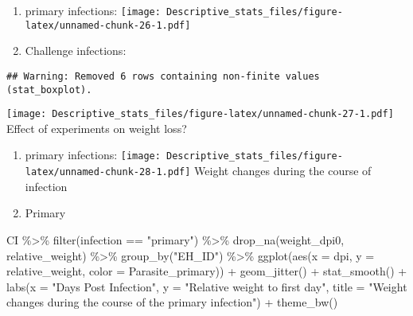 \documentclass[
]{article}
\newenvironment{Shaded}{\begin{snugshade}}{\end{snugshade}}
\newcommand{\AttributeTok}[1]{\textcolor[rgb]{0.77,0.63,0.00}{#1}}
\newcommand{\FunctionTok}[1]{\textcolor[rgb]{0.00,0.00,0.00}{#1}}
\newcommand{\NormalTok}[1]{#1}
\newcommand{\SpecialCharTok}[1]{\textcolor[rgb]{0.00,0.00,0.00}{#1}}
\newcommand{\StringTok}[1]{\textcolor[rgb]{0.31,0.60,0.02}{#1}}
\providecommand{\tightlist}{%
  \setlength{\itemsep}{0pt}\setlength{\parskip}{0pt}}
\begin{document}
\begin{enumerate}
\def\labelenumi{\arabic{enumi}.}
\item
  primary infections:
  \texttt{[image: Descriptive\_stats\_files/figure-latex/unnamed-chunk-26-1.pdf]}
\item
  Challenge infections:
\end{enumerate}

\begin{verbatim}
## Warning: Removed 6 rows containing non-finite values (stat_boxplot).
\end{verbatim}

\texttt{[image: Descriptive\_stats\_files/figure-latex/unnamed-chunk-27-1.pdf]}
Effect of experiments on weight loss?

\begin{enumerate}
\def\labelenumi{\arabic{enumi}.}
\tightlist
\item
  primary infections:
  \texttt{[image: Descriptive\_stats\_files/figure-latex/unnamed-chunk-28-1.pdf]}
  Weight changes during the course of infection
\item
  Primary
\end{enumerate}

\begin{Shaded}
\begin{Highlighting}[]
\NormalTok{CI }\SpecialCharTok{\%\textgreater{}\%} 
    \FunctionTok{filter}\NormalTok{(infection }\SpecialCharTok{==} \StringTok{"primary"}\NormalTok{) }\SpecialCharTok{\%\textgreater{}\%}
    \FunctionTok{drop\_na}\NormalTok{(weight\_dpi0, relative\_weight) }\SpecialCharTok{\%\textgreater{}\%}
    \FunctionTok{group\_by}\NormalTok{(}\StringTok{"EH\_ID"}\NormalTok{) }\SpecialCharTok{\%\textgreater{}\%}
    \FunctionTok{ggplot}\NormalTok{(}\FunctionTok{aes}\NormalTok{(}\AttributeTok{x =}\NormalTok{ dpi, }\AttributeTok{y =}\NormalTok{ relative\_weight, }\AttributeTok{color =}\NormalTok{ Parasite\_primary)) }\SpecialCharTok{+}
    \FunctionTok{geom\_jitter}\NormalTok{() }\SpecialCharTok{+}
    \FunctionTok{stat\_smooth}\NormalTok{() }\SpecialCharTok{+}
    \FunctionTok{labs}\NormalTok{(}\AttributeTok{x =} \StringTok{"Days Post Infection"}\NormalTok{, }\AttributeTok{y =} \StringTok{"Relative weight to first day"}\NormalTok{,}
         \AttributeTok{title =} \StringTok{"Weight changes during the course of the primary infection"}\NormalTok{) }\SpecialCharTok{+}
    \FunctionTok{theme\_bw}\NormalTok{()}
\end{Highlighting}
\end{Shaded}
\end{document}
